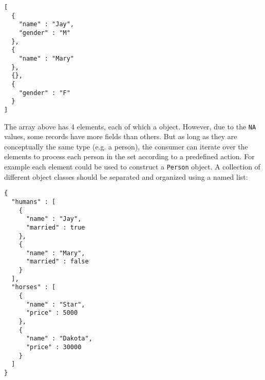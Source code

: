 \begin{knitrout}\mycodesize
{}\color{fgcolor}\begin{kframe}
\begin{alltt}
 \hlkwb{<-} \hlstd{(} \hlstd{=} \hlstd{(}\hlstd{,} \hlstd{,} \hlstd{,} \hlstd{),}  \hlstd{=} \hlstd{(}\hlstd{,} \hlstd{,} \hlstd{,} \hlstd{))}
\hlstd{(}  \hlstd{=} \hlstd{))}
\end{alltt}
\begin{verbatim}
[
  {
    "name" : "Jay",
    "gender" : "M"
  },
  {
    "name" : "Mary"
  },
  {},
  {
    "gender" : "F"
  }
]
\end{verbatim}
\end{kframe}
\end{knitrout}


The \JSON array above has 4 elements, each of which a \JSON object. However, due to the \texttt{NA} values, some records have more fields than others. But as long as they are conceptually the same type (e.g. a person), the consumer can iterate over the elements to process each person in the set according to a predefined action. For example each element could be used to construct a \texttt{Person} object. A collection of different object classes should be separated and organized using a named list:

\begin{knitrout}\mycodesize
{}\color{fgcolor}\begin{kframe}
\begin{alltt}
 \hlkwb{<-} \hlstd{(}
   \hlstd{=} \hlstd{(} \hlstd{=} \hlstd{(}\hlstd{,} \hlstd{),}  \hlstd{=} \hlstd{(}\hlstd{,} \hlstd{)),}
   \hlstd{=} \hlstd{(} \hlstd{=} \hlstd{(}\hlstd{,} \hlstd{),}  \hlstd{=} \hlstd{(}\hlstd{,} \hlstd{))}
\hlstd{)}
\hlstd{(} \hlstd{=}\hlstd{))}
\end{alltt}
\begin{verbatim}
{
  "humans" : [
    {
      "name" : "Jay",
      "married" : true
    },
    {
      "name" : "Mary",
      "married" : false
    }
  ],
  "horses" : [
    {
      "name" : "Star",
      "price" : 5000
    },
    {
      "name" : "Dakota",
      "price" : 30000
    }
  ]
}
\end{verbatim}
\end{kframe}
\end{knitrout}


